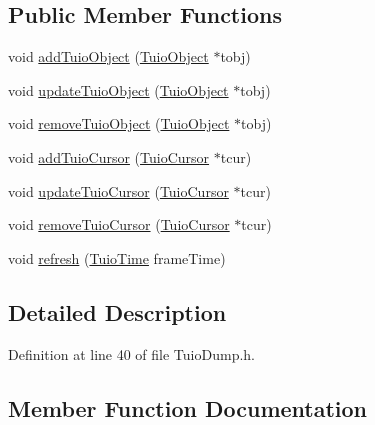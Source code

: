 \subsection*{Public Member Functions}
\begin{DoxyCompactItemize}
\item 
void \hyperlink{class_tuio_dump_a978520453aaf17d3409ae13573b7334f}{add\+Tuio\+Object} (\hyperlink{class_t_u_i_o_1_1_tuio_object}{Tuio\+Object} $\ast$tobj)
\item 
void \hyperlink{class_tuio_dump_a0bade2cba83fe3dcdb11ca475e2f4862}{update\+Tuio\+Object} (\hyperlink{class_t_u_i_o_1_1_tuio_object}{Tuio\+Object} $\ast$tobj)
\item 
void \hyperlink{class_tuio_dump_a5ed9e2ea7858b885bf52558c1c6e7e69}{remove\+Tuio\+Object} (\hyperlink{class_t_u_i_o_1_1_tuio_object}{Tuio\+Object} $\ast$tobj)
\item 
void \hyperlink{class_tuio_dump_ab633ec2cbd9472a8c128fac33fca183f}{add\+Tuio\+Cursor} (\hyperlink{class_t_u_i_o_1_1_tuio_cursor}{Tuio\+Cursor} $\ast$tcur)
\item 
void \hyperlink{class_tuio_dump_a6b54d0d57d714c5b51f5cf76a9b8b62a}{update\+Tuio\+Cursor} (\hyperlink{class_t_u_i_o_1_1_tuio_cursor}{Tuio\+Cursor} $\ast$tcur)
\item 
void \hyperlink{class_tuio_dump_a29bea77556080ef3a2efea2d20b17b54}{remove\+Tuio\+Cursor} (\hyperlink{class_t_u_i_o_1_1_tuio_cursor}{Tuio\+Cursor} $\ast$tcur)
\item 
void \hyperlink{class_tuio_dump_a8a664f2e278fac90065c57e366d4277e}{refresh} (\hyperlink{class_t_u_i_o_1_1_tuio_time}{Tuio\+Time} frame\+Time)
\end{DoxyCompactItemize}


\subsection{Detailed Description}


Definition at line 40 of file Tuio\+Dump.\+h.



\subsection{Member Function Documentation}
\mbox{\label{class_tuio_dump_ab633ec2cbd9472a8c128fac33fca183f}} 
